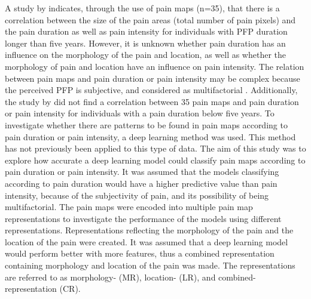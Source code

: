 \noindent
A study by \citeauthor{Boudreau2017} \citep{Boudreau2017} indicates, through the use of pain maps (n=35), that there is a correlation between the size of the pain areas (total number of pain pixels) and the pain duration as well as pain intensity for individuals with PFP duration longer than five years.\citep{Boudreau2017}
However, it is unknown whether pain duration has an influence on the morphology of the pain and location, as well as whether the morphology of pain and location have an influence on pain intensity.
The relation between pain maps and pain duration or pain intensity may be complex because the perceived PFP is subjective, and considered as multifactorial \citep{Dansie2013}. Additionally, the study by \citeauthor{Boudreau2017} \citep{Boudreau2017} did not find a correlation between 35 pain maps and pain duration or pain intensity for individuals with a pain duration below five years. To investigate whether there are patterns to be found in pain maps according to pain duration or pain intensity, a deep learning method was used. This method has not previously been applied to this type of data. \newline
\noindent
The aim of this study was to explore how accurate a deep learning model could classify pain maps according to pain duration or pain intensity. It was assumed that the models classifying according to pain duration would have a higher predictive value than pain intensity, because of the subjectivity of pain, and its possibility of being multifactorial. The pain maps were encoded into multiple pain map representations to investigate the performance of the models using different representations. Representations reflecting the morphology of the pain and the location of the pain were created. It was assumed that a deep learning model would perform better with more features, thus a combined representation containing morphology and location of the pain was made. The representations are referred to as morphology- (MR), location- (LR), and combined-representation (CR).
